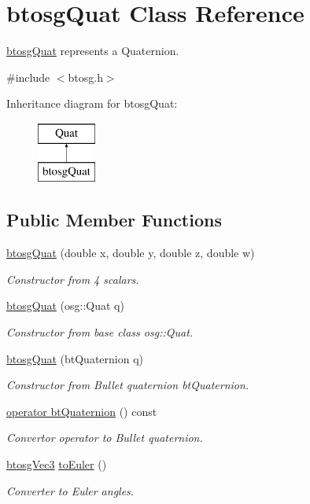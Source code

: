 \hypertarget{classbtosgQuat}{}\section{btosg\+Quat Class Reference}
\label{classbtosgQuat}


\hyperlink{classbtosgQuat}{btosg\+Quat} represents a Quaternion.  




{\ttfamily \#include $<$btosg.\+h$>$}

Inheritance diagram for btosg\+Quat\+:\begin{figure}[H]
\begin{center}
\leavevmode
\includegraphics[height=2.000000cm]{classbtosgQuat}
\end{center}
\end{figure}
\subsection*{Public Member Functions}
\begin{DoxyCompactItemize}
\item 
\hyperlink{classbtosgQuat_a8ef8fc0d1503426d5e0ead87edfa5acf}{btosg\+Quat} (double x, double y, double z, double w)
\begin{DoxyCompactList}\small\item\em Constructor from 4 scalars. \end{DoxyCompactList}\item 
\hyperlink{classbtosgQuat_aa7646a03371b8aaa2caeba3f4b198ad6}{btosg\+Quat} (osg\+::\+Quat q)
\begin{DoxyCompactList}\small\item\em Constructor from base class osg\+::\+Quat. \end{DoxyCompactList}\item 
\hyperlink{classbtosgQuat_a9fc1530e0eb06c2432f1633bf08db8a2}{btosg\+Quat} (bt\+Quaternion q)
\begin{DoxyCompactList}\small\item\em Constructor from Bullet quaternion bt\+Quaternion. \end{DoxyCompactList}\item 
\hyperlink{classbtosgQuat_addfd68e2130ff8bb51c582524de5a345}{operator bt\+Quaternion} () const
\begin{DoxyCompactList}\small\item\em Convertor operator to Bullet quaternion. \end{DoxyCompactList}\item 
\hyperlink{classbtosgVec3}{btosg\+Vec3} \hyperlink{classbtosgQuat_aeda394d825b449ab87a77820aad1737d}{to\+Euler} ()
\begin{DoxyCompactList}\small\item\em Converter to Euler angles. \end{DoxyCompactList}\end{DoxyCompactItemize}


